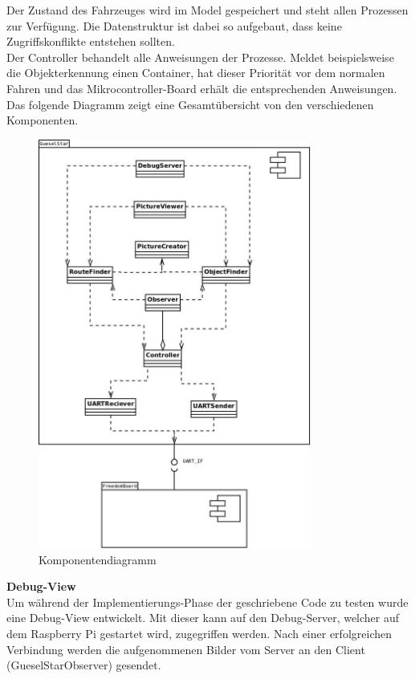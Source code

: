 Der Zustand des Fahrzeuges wird im Model gespeichert und steht allen Prozessen zur Verfügung. Die Datenstruktur ist dabei so aufgebaut, dass keine Zugriffskonflikte entstehen sollten.\\
Der Controller behandelt alle Anweisungen der Prozesse. Meldet beispielsweise die Objekterkennung einen Container, hat dieser Priorität vor dem normalen Fahren und das Mikrocontroller-Board erhält die entsprechenden Anweisungen. Das folgende Diagramm zeigt eine Gesamtübersicht von den verschiedenen Komponenten.\\[0.2cm]
\begin{figure}[H]
\centering
\includegraphics[width=0.8\textwidth]{03_Loesungskonzept/pictures/Komponentendiagramm_detailliert_v2.jpeg}
\caption{Komponentendiagramm}
\end{figure}

\textbf{Debug-View}\\[0.2cm]
Um während der Implementierungs-Phase der geschriebene Code zu testen wurde eine Debug-View entwickelt. Mit dieser kann auf den Debug-Server, welcher auf dem Raspberry Pi gestartet wird, zugegriffen werden. Nach einer erfolgreichen Verbindung werden die aufgenommenen Bilder vom Server an den Client (GueselStarObserver) gesendet.

